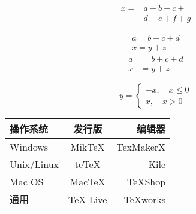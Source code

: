 \documentclass{article}
\begin{document}
\[\begin{aligned}
x ={}& a+b+c+{} \\
&d+e+f+g
\end{aligned}\]

\begin{gather}
a = b+c+d \\
x = y+z
\end{gather}
\begin{align}
a &= b+c+d \\
x &= y+z
\end{align}

\[ y=
\begin{cases}
-x,\quad x\leq 0 \\
x,\quad x>0
\end{cases} \]

\begin{tabular}{|l|c|r|}
 \hline
操作系统& 发行版& 编辑器\\
 \hline
Windows & MikTeX & TexMakerX \\
 \hline
Unix/Linux & teTeX & Kile \\
 \hline
Mac OS & MacTeX & TeXShop \\
 \hline
通用& TeX Live & TeXworks \\
 \hline
\end{tabular}
\end{document}
